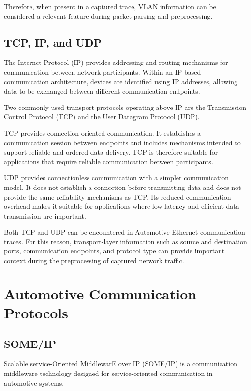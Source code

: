 Therefore, when present in a captured trace, VLAN information can be considered a relevant feature during packet parsing and preprocessing.

\subsection{TCP, IP, and UDP}

The Internet Protocol (IP) provides addressing and routing mechanisms for communication between network participants. Within an IP-based communication architecture, devices are identified using IP addresses, allowing data to be exchanged between different communication endpoints.

Two commonly used transport protocols operating above IP are the Transmission Control Protocol (TCP) and the User Datagram Protocol (UDP).

TCP provides connection-oriented communication. It establishes a communication session between endpoints and includes mechanisms intended to support reliable and ordered data delivery. TCP is therefore suitable for applications that require reliable communication between participants.

UDP provides connectionless communication with a simpler communication model. It does not establish a connection before transmitting data and does not provide the same reliability mechanisms as TCP. Its reduced communication overhead makes it suitable for applications where low latency and efficient data transmission are important.

Both TCP and UDP can be encountered in Automotive Ethernet communication traces. For this reason, transport-layer information such as source and destination ports, communication endpoints, and protocol type can provide important context during the preprocessing of captured network traffic.

\section{Automotive Communication Protocols}

\subsection{SOME/IP}

Scalable service-Oriented MiddlewarE over IP (SOME/IP) is a communication middleware technology designed for service-oriented communication in automotive systems.

